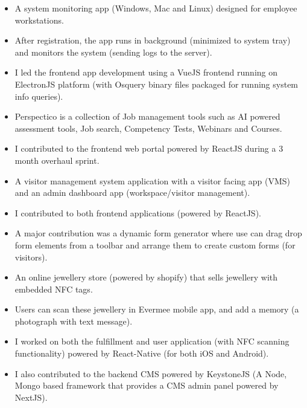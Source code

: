 \documentclass[10pt,a4paper,ragged2e]{altacv}
\begin{document}


\begin{itemize}
\item A system monitoring app (Windows, Mac and Linux) designed for employee workstations.
\item After registration, the app runs in background (minimized to system tray) and monitors the system (sending logs to the server).
\item I led the frontend app development using a VueJS frontend running on ElectronJS platform (with Osquery binary files packaged for running system info queries).
\end{itemize}
\smallskip
\smallskip


\begin{itemize}
\item Perspectico is a collection of Job management tools such as AI powered assessment tools, Job search, Competency Tests, Webinars and Courses.
\item I contributed to the frontend web portal powered by ReactJS during a 3 month overhaul sprint. 
\end{itemize}
\smallskip
\smallskip 


\begin{itemize}
\item A visitor management system application with a visitor facing app (VMS) and an admin dashboard app (workspace/visitor management).
\item I contributed to both frontend applications (powered by ReactJS).
\item A major contribution was a dynamic form generator where use can drag drop form elements from a toolbar and arrange them to create custom forms (for visitors).
\end{itemize}
\smallskip
\smallskip 


\begin{itemize}
\item An online jewellery store (powered by shopify) that sells jewellery with embedded NFC tags.
\item Users can scan these jewellery in Evermee mobile app, and add a memory (a photograph with text message).
\item I worked on both the fulfillment and user application (with NFC scanning functionality) powered by React-Native (for both iOS and Android). 
\item I also contributed to the backend CMS powered by KeystoneJS (A Node, Mongo based framework that provides a CMS admin panel powered by NextJS).
\end{itemize}
\smallskip
\smallskip
\end{document}

